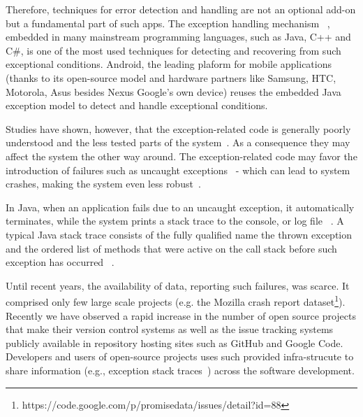 \documentclass[conference]{IEEEtran}
\begin{document}
Therefore, techniques for error detection and handling are not  an optional add-on but a 
fundamental part of such apps. The exception handling mechanism ~\cite{goodenough1975exception},
embedded in many mainstream programming languages, such as Java, C++ and C\#,
 is one of the most used techniques for detecting and recovering from such exceptional conditions. 
Android, the leading plaform for mobile applications~\cite{gartner} (thanks to its open-source 
model and hardware partners like Samsung, HTC, Motorola, Asus besides Nexus Google's
 own device)  reuses the embedded Java exception model to detect and handle 
 exceptional conditions.

Studies have shown, however, that the exception-related code is generally poorly understood and the
 less tested parts of the system~\cite{miller1997issues,Robil00,shah2010understanding, 
garcia2007extracting,garcia2001comparative,cabral2007exception,coelho2011unveiling}.
As a consequence they may affect the system the other way around.
The exception-related code may favor the introduction of failures such as 
uncaught exceptions~\cite{jo2004uncaught, Zhang12} - 
which can lead to system crashes, making the system even less robust~\cite{coelho2011unveiling}.

In Java, when an application fails due to an uncaught exception, 
it automatically terminates, while the system prints a stack trace to the console, 
or log file ~\cite{gosling2000java}.  A typical Java stack trace consists of  the fully qualified name 
the thrown exception and the ordered list of methods that were active on the call stack before 
such exception has occurred ~\cite{gosling2000java,bloch2008effective}.

Until recent years, the availability of data, reporting such failures, was scarce. 
It comprised only few large scale projects (e.g. the Mozilla crash report dataset\footnote{https://code.google.com/p/promisedata/issues/detail?id=88}).
Recently we have observed a rapid increase in the number of open
source projects that make their version control systems as well as the issue tracking systems
publicly available in repository hosting sites such as GitHub and Google Code.
Developers and users of open-source projects uses such provided
 infra-strucute to share information (e.g., exception stack traces~\cite{bettenburg2008makes,schroter2010stack}) across 
the software development.

\end{document}
